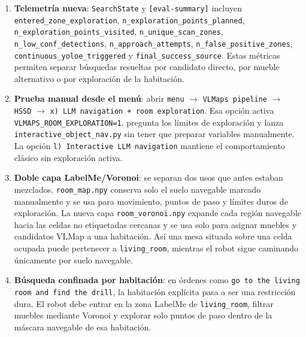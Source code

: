 \documentclass[11pt,a4paper]{article}
\begin{document}
\begin{enumerate}
        exploración está desactivada para no alterar experimentos previos.
  \item \textbf{Telemetría nueva}: \texttt{SearchState} y
        \texttt{[eval-summary]} incluyen
        \texttt{entered\_zone\_exploration},
        \texttt{n\_exploration\_points\_planned},
        \texttt{n\_exploration\_points\_visited},
        \texttt{n\_unique\_scan\_zones},
        \texttt{n\_low\_conf\_detections},
        \texttt{n\_approach\_attempts},
        \texttt{n\_false\_positive\_zones},
        \texttt{continuous\_yoloe\_triggered} y
        \texttt{final\_success\_source}. Estas métricas permiten separar
        búsquedas resueltas por candidato directo, por mueble alternativo o por
        exploración de la habitación.
  \item \textbf{Prueba manual desde el menú}: abrir \texttt{menu}
        $\rightarrow$ \texttt{VLMaps pipeline} $\rightarrow$ \texttt{HSSD}
        $\rightarrow$ \texttt{x) LLM navigation + room exploration}. Esa opción
        activa \texttt{VLMAPS\_ROOM\_EXPLORATION=1}, pregunta los límites de
        exploración y lanza \texttt{interactive\_object\_nav.py} sin tener que
        preparar variables manualmente. La opción \texttt{l) Interactive LLM
        navigation} mantiene el comportamiento clásico sin exploración activa.
  \item \textbf{Doble capa LabelMe/Voronoi}: se separan dos usos que antes
        estaban mezclados. \texttt{room\_map.npy} conserva solo el suelo
        navegable marcado manualmente y se usa para movimiento, puntos de paso
        y límites duros de exploración. La nueva capa
        \texttt{room\_voronoi.npy} expande cada región navegable hacia las
        celdas no etiquetadas cercanas y se usa solo para asignar muebles y
        candidatos VLMap a una habitación. Así una mesa situada sobre una celda
        ocupada puede pertenecer a \texttt{living\_room}, mientras el robot
        sigue caminando únicamente por suelo navegable.
  \item \textbf{Búsqueda confinada por habitación}: en órdenes como
        \texttt{go to the living room and find the drill}, la habitación
        explícita pasa a ser una restricción dura. El robot debe entrar en la
        zona LabelMe de \texttt{living\_room}, filtrar muebles mediante
        Voronoi y explorar solo puntos de paso dentro de la máscara navegable
        de esa habitación.
\end{enumerate}
\end{document}

